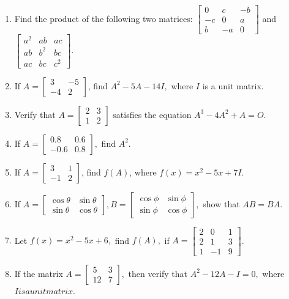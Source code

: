 \begin{enumerate}
\item Find the product of the following two matrices: $\begin{bmatrix}0 & c & -b \\ -c & 0 & a \\ b & -a & 0\end{bmatrix}$ and
  $\begin{bmatrix}a^2 & ab & ac \\ ab & b^2 & bc \\ ac & bc & c^2\end{bmatrix}$.
\item If $A = \begin{bmatrix}3 & -5 \\ -4 & 2\end{bmatrix}$, find $A^2 - 5A - 14I,$ where $I$ is a unit matrix.
\item Verify that $A = \begin{bmatrix}2 & 3\\ 1 & 2\end{bmatrix}$ satisfies the equation $A^3 - 4A^2 + A = O$.
\item If $A = \begin{bmatrix}0.8 & 0.6 \\ -0.6 & 0.8\end{bmatrix},$ find $A^2$.
\item If $A = \begin{bmatrix}3 & 1 \\ -1 & 2\end{bmatrix}$, find $f(A)$, where $f(x) = x^2 - 5x + 7I$.
\item If $A=\begin{bmatrix}\cos\theta & \sin\theta \\ \sin\theta & \cos\theta \end{bmatrix}, B = \begin{bmatrix}\cos\phi & \sin\phi
  \\\sin\phi & \cos\phi \end{bmatrix},$ show that $AB = BA$.
\item Let $f(x) = x^2 - 5x + 6,$ find $f(A),$ if $A = \begin{bmatrix} 2 & 0 & 1 \\ 2 & 1 & 3 \\ 1 & -1 & 9\end{bmatrix}$.
\item If the matrix $A = \begin{bmatrix}5 & 3 \\ 12 & 7\end{bmatrix},$ then verify that $A^2 - 12 A - I = 0,$ where $I is a unit matrix$.

\end{enumerate}
